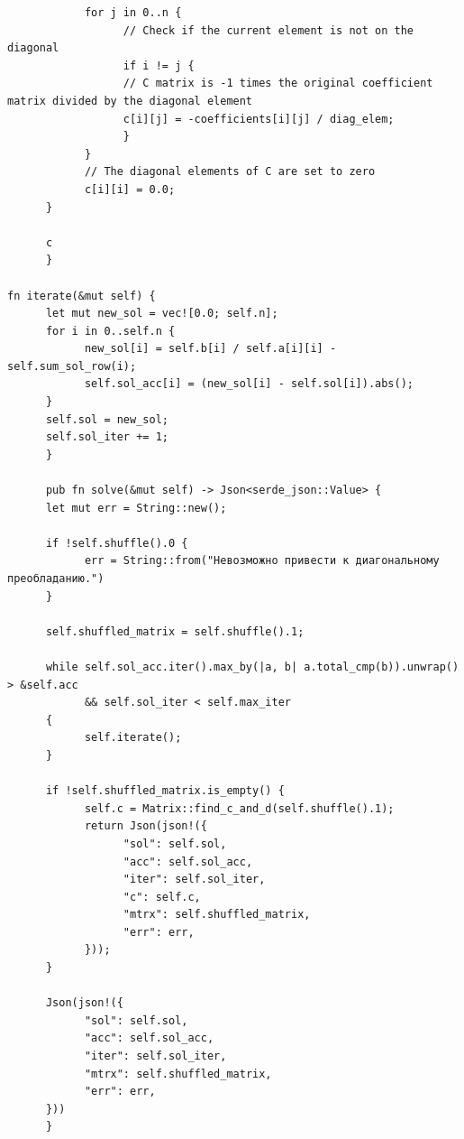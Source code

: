 \documentclass{article}
\begin{document}
\begin{lstlisting}
            for j in 0..n {
                  // Check if the current element is not on the diagonal
                  if i != j {
                  // C matrix is -1 times the original coefficient matrix divided by the diagonal element
                  c[i][j] = -coefficients[i][j] / diag_elem;
                  }
            }
            // The diagonal elements of C are set to zero
            c[i][i] = 0.0;
      }

      c
      }

fn iterate(&mut self) {
      let mut new_sol = vec![0.0; self.n];
      for i in 0..self.n {
            new_sol[i] = self.b[i] / self.a[i][i] - self.sum_sol_row(i);
            self.sol_acc[i] = (new_sol[i] - self.sol[i]).abs();
      }
      self.sol = new_sol;
      self.sol_iter += 1;
      }

      pub fn solve(&mut self) -> Json<serde_json::Value> {
      let mut err = String::new();

      if !self.shuffle().0 {
            err = String::from("Невозможно привести к диагональному преобладанию.")
      }

      self.shuffled_matrix = self.shuffle().1;

      while self.sol_acc.iter().max_by(|a, b| a.total_cmp(b)).unwrap() > &self.acc
            && self.sol_iter < self.max_iter
      {
            self.iterate();
      }

      if !self.shuffled_matrix.is_empty() {
            self.c = Matrix::find_c_and_d(self.shuffle().1);
            return Json(json!({
                  "sol": self.sol,
                  "acc": self.sol_acc,
                  "iter": self.sol_iter,
                  "c": self.c,
                  "mtrx": self.shuffled_matrix,
                  "err": err,
            }));
      }

      Json(json!({
            "sol": self.sol,
            "acc": self.sol_acc,
            "iter": self.sol_iter,
            "mtrx": self.shuffled_matrix,
            "err": err,
      }))
      }
\end{lstlisting}
\end{document}
